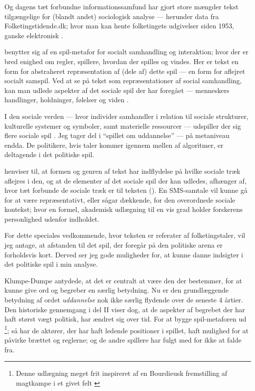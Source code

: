 Og dagens tæt forbundne informationssamfund har gjort store mængder tekst tilgængelige for (blandt andet) sociologisk analyse --- herunder data fra Folketingstidende.dk; hvor man kan hente folketingets udgivelser siden 1953, ganske elektronisk \autocite{folketingstidendeOmFolketingstidende}.

\citeauthor{evansMachineTranslationMining2016} benytter sig af en spil-metafor for socialt samhandling og interaktion; hvor der er bred enighed om regler, spillere, hvordan der spilles og vindes.
Her er tekst en form for abstraheret repræsentation af (dele af) dette spil --- en form for aflejret socialt samspil.
Ved at se på tekst som repræsentationer af social samhandling, kan man udlede aspekter af det sociale spil der har foregået — menneskers handlinger, holdninger, følelser og viden \autocite[s. 22]{evansMachineTranslationMining2016}.

I den sociale verden — hvor individer samhandler i relation til sociale strukturer, kulturelle systemer og symboler, samt materielle ressourcer — udspiller der sig flere sociale spil \autocite[s. 23]{evansMachineTranslationMining2016}.
Jeg tager del i “spillet om uddannelse” --- på metaniveau endda.
De politikere, hvis taler kommer igennem møllen af algoritmer, er deltagende i det politiske spil.

\citeauthor{evansComputationSociologicalImagination2019} henviser til, at formen og genren af tekst har indflydelse på hvilke sociale træk aflejres i den, og at de elementer af det sociale spil der kan udledes, afhænger af, hvor tæt forbunde de sociale træk er til teksten (\citeyear[s. 23f]{evansMachineTranslationMining2016}). 
En SMS-samtale vil kunne gå for at være repræsentativt, eller sågar dækkende, for den overordnede sociale kontekst; hvor en formel, akademisk udlægning til en vis grad holder forskerens personlighed udenfor indholdet.

For dette speciales vedkommende, hvor teksten er referater af folketingstaler, vil jeg antage, at afstanden til det spil, der foregår på den politiske arena er forholdsvis kort.
Derved ser jeg gode muligheder for, at kunne danne indsigter i det politiske spil i min analyse.

Klumpe-Dumpe antydede, at det er centralt at være den der bestemmer, for at kunne give ord og begreber en særlig betydning.
Nu er den grundlæggende betydning af ordet \textit{uddannelse} nok ikke særlig flydende over de seneste 4 årtier.
Den historiske gennemgang i del II viser dog, at de aspekter af begrebet der har haft størst vægt politisk, har ændret sig over tid.
For at bygge spil-metaforen ud \footnote{Denne udlægning meget frit inspireret af en Bourdieusk fremstilling af magtkampe i et givet felt \autocite[kap.
1]{bourdieuFieldCulturalProduction2004}}; så har de aktører, der har haft ledende positioner i spillet, haft mulighed for at påvirke brættet og reglerne; og de andre spillere har fulgt med for ikke at falde fra.


